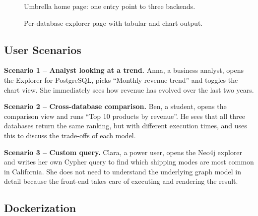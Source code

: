 \documentclass[11pt,a4paper]{article}
\begin{document}
\begin{figure}[H]
\centering
\caption{Umbrella home page: one entry point to three backends.}
\label{fig:home}
\end{figure}

\begin{figure}[H]
\centering
\caption{Per-database explorer page with tabular and chart output.}
\label{fig:explorer}
\end{figure}

\subsection{User Scenarios}

\textbf{Scenario 1 -- Analyst looking at a trend.} Anna, a business analyst,
opens the Explorer for PostgreSQL, picks ``Monthly revenue trend'' and
toggles the chart view. She immediately sees how revenue has evolved over
the last two years.

\textbf{Scenario 2 -- Cross-database comparison.} Ben, a student, opens the
comparison view and runs ``Top 10 products by revenue''. He sees that all
three databases return the same ranking, but with different execution times,
and uses this to discuss the trade-offs of each model.

\textbf{Scenario 3 -- Custom query.} Clara, a power user, opens the Neo4j
explorer and writes her own Cypher query to find which shipping modes are
most common in California. She does not need to understand the underlying
graph model in detail because the front-end takes care of executing and
rendering the result.

\subsection{Dockerization}
\end{document}
